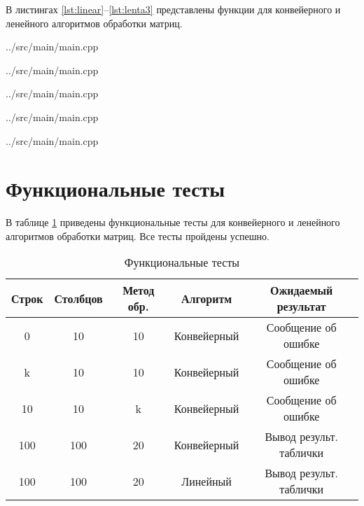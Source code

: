 В листингах \ref{lst:linear}--\ref{lst:lenta3} представлены функции для конвейерного и ленейного алгоритмов обработки матриц.

\begin{lstinputlisting}[
	caption={Алгоритм линейной обработки данных},
	label={lst:linear},
	linerange={217-268}
	]{../src/main/main.cpp}
\end{lstinputlisting}

\begin{lstinputlisting}[
	caption={Алгоритм конвейерной обработки данных},
	label={lst:parallel},
	linerange={339-382}
	]{../src/main/main.cpp}
\end{lstinputlisting}

\begin{lstinputlisting}[
	caption={Алгоритм транспонирования матрицы},
	label={lst:lenta1},
	linerange={30-39}
	]{../src/main/main.cpp}
\end{lstinputlisting}

\begin{lstinputlisting}[
	caption={Алгоритм сложения двух матриц},
	label={lst:lenta2},
	linerange={40-49}
	]{../src/main/main.cpp}
\end{lstinputlisting}

\begin{lstinputlisting}[
	caption={Алгоритм умножения двух матриц},
	label={lst:lenta3},
	linerange={50-60}
	]{../src/main/main.cpp}
\end{lstinputlisting}

\section{Функциональные тесты}

В таблице \ref{tbl:functional_test} приведены функциональные тесты для конвейерного и ленейного алгоритмов обработки матриц. Все тесты пройдены успешно.

\begin{table}[h]
	\begin{center}
	\begin{threeparttable}
		\captionsetup{justification=raggedright,singlelinecheck=off}
		\caption{\label{tbl:functional_test} Функциональные тесты}
		\begin{tabular}{|c|c|c|c|c|}
			\hline
			Строк & Столбцов & Метод обр. & Алгоритм & Ожидаемый результат 
			\\ \hline
			0 & 10 & 10 & Конвейерный & Сообщение об ошибке 
			\\ \hline
			k & 10 & 10 & Конвейерный & Сообщение об ошибке 
			\\ \hline
			10 & 10 & k & Конвейерный & Сообщение об ошибке 
			\\ \hline
			100 & 100 & 20 & Конвейерный & Вывод результ. таблички
			\\ \hline
			100 & 100 & 20 & Линейный & Вывод результ. таблички
			\\ \hline
		\end{tabular}
	\end{threeparttable}
	\end{center}
\end{table}
